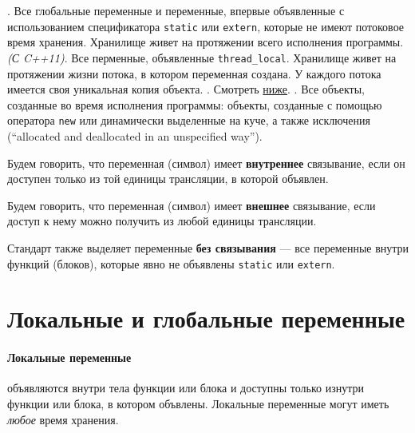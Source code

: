 \begin{itemize}
  . Все глобальные переменные и переменные, впервые объявленные с использованием
  спецификатора \verb|static| или \verb|extern|, которые не имеют потоковое время хранения.
  Хранилище живет на протяжении всего исполнения программы.
   {\small\textit{(С C++11)}}. Все перменные, объявленные \verb|thread_local|.
  Хранилище живет на протяжении жизни потока, в котором переменная создана. У каждого потока имеется
  своя уникальная копия объекта.
  . Смотреть \hyperref[def:auto_storage]{ниже}.
  . Все объекты, созданные во время исполнения программы:
  объекты, созданные с помощью оператора \verb|new| или динамически выделенные на куче,
  а также исключения (``allocated and deallocated in an unspecified way'').
\end{itemize}

Будем говорить, что переменная (символ) имеет \textbf{внутреннее} связывание, если он доступен
только из той единицы трансляции, в которой объявлен.

Будем говорить, что переменная (символ) имеет \textbf{внешнее} связывание, если доступ к нему
можно получить из любой единицы трансляции.

Стандарт также выделяет переменные \textbf{без связывания} --- все переменные внутри функций (блоков),
которые явно не объявлены \verb|static| или \verb|extern|.

\section{Локальные и глобальные переменные}
\paragraph{Локальные переменные} объявляются внутри тела функции или блока и доступны только изнутри
функции или блока, в котором объвлены. Локальные переменные могут иметь \textit{любое} время хранения.

